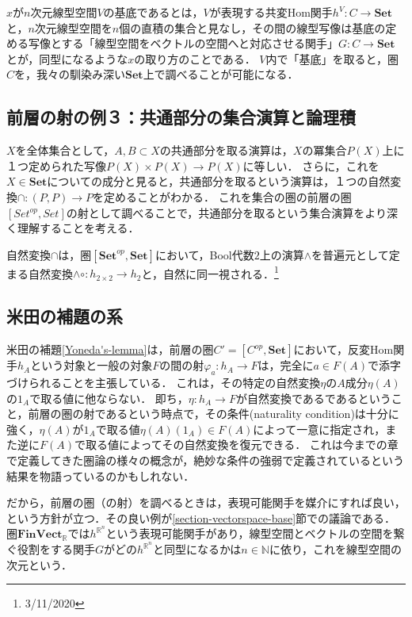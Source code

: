 \documentclass[uplatex, 12pt, dvipdfmx]{jsreport}
\begin{document}
\begin{screen}
    $x$が$n$次元線型空間$V$の基底であるとは，$V$が表現する共変Hom関手$h^V:C\to\mathbf{Set}$と，$n$次元線型空間を$n$個の直積の集合と見なし，その間の線型写像は基底の定める写像とする「線型空間をベクトルの空間へと対応させる関手」$G:C\to\mathbf{Set}$とが，同型になるような$x$の取り方のことである．
    $V$内で「基底」を取ると，圏$C$を，我々の馴染み深い$\mathbf{Set}$上で調べることが可能になる．
\end{screen}

\subsection{前層の射の例３：共通部分の集合演算と論理積}

$X$を全体集合として，$A,B\subset X$の共通部分を取る演算は，$X$の冪集合$P(X)$上に１つ定められた写像$P(X)\times P(X)\to P(X)$に等しい．
さらに，これを$X\in\mathbf{Set}$についての成分と見ると，共通部分を取るという演算は，１つの自然変換$\cap :(P,P)\to P$を定めることがわかる．
これを集合の圏の前層の圏$[Set^{op},Set]$の射として調べることで，共通部分を取るという集合演算をより深く理解することを考える．

\begin{screen}\rm{}
    自然変換$\cap$は，圏$[\mathbf{Set}^{op}, \mathbf{Set}]$において，Bool代数$2$上の演算$\wedge$を普遍元として定まる自然変換$\wedge\circ :h_{2\times 2}\to h_2$と，自然に同一視される．\footnote{3/11/2020}
\end{screen}

\subsection{米田の補題の系}

米田の補題\ref{Yoneda's-lemma}は，前層の圏$C'=[C^{op},\mathbf{Set}]$において，反変Hom関手$h_A$という対象と一般の対象$F$の間の射$\varphi_a:h_A\to F$は，完全に$a\in F(A)$で添字づけられることを主張している．
これは，その特定の自然変換$\eta$の$A$成分$\eta(A)$の$1_A$で取る値に他ならない．
即ち，$\eta:h_A\to F$が自然変換であるであるということ，前層の圏の射であるという時点で，その条件(naturality condition)は十分に強く，$\eta(A)$が$1_A$で取る値$\eta(A)(1_A)\in F(A)$によって一意に指定され，また逆に$F(A)$で取る値によってその自然変換を復元できる．
これは今までの章で定義してきた圏論の様々の概念が，絶妙な条件の強弱で定義されているという結果を物語っているのかもしれない．

だから，前層の圏（の射）を調べるときは，表現可能関手を媒介にすれば良い，という方針が立つ．その良い例が\ref{section-vectorspace-base}節での議論である．圏$\mathbf{FinVect}_\mathbb{R}$では$h^{\mathbb{R}^n}$という表現可能関手があり，線型空間とベクトルの空間を繋ぐ役割をする関手$G$がどの$h^{\mathbb{R}^n}$と同型になるかは$n\in\mathbb{N}$に依り，これを線型空間の次元という．
\end{document}
